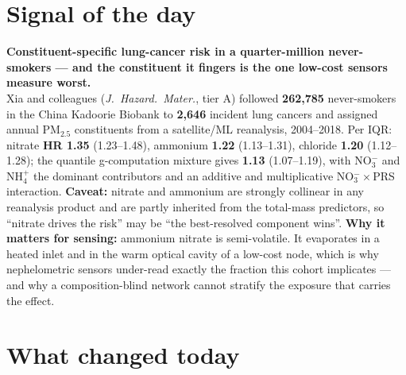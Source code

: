 \documentclass[10pt]{article}
\begin{document}
\vspace{6mm}

\section*{\sffamily\bfseries\color{Deep}Signal of the day}
\vspace{-1.5mm}{\color{Amber}\rule{\linewidth}{1.1pt}}\vspace{2.5mm}

\begin{keybox}
{\sffamily\bfseries\small\color{Deep}Constituent-specific lung-cancer risk in a quarter-million
never-smokers --- and the constituent it fingers is the one low-cost sensors measure worst.}\\[1.4mm]
\footnotesize
Xia and colleagues (\textit{J.\ Hazard.\ Mater.}, tier A) followed \textbf{262,785} never-smokers in the
China Kadoorie Biobank to \textbf{2,646} incident lung cancers and assigned annual PM$_{2.5}$ constituents
from a satellite/ML reanalysis, 2004--2018. Per IQR: nitrate \textbf{HR 1.35} (1.23--1.48), ammonium
\textbf{1.22} (1.13--1.31), chloride \textbf{1.20} (1.12--1.28); the quantile g-computation mixture gives
\textbf{1.13} (1.07--1.19), with NO$_3^-$ and NH$_4^+$ the dominant contributors and an additive and
multiplicative NO$_3^-\times$PRS interaction. \textbf{Caveat:} nitrate and ammonium are strongly collinear
in any reanalysis product and are partly inherited from the total-mass predictors, so ``nitrate drives the
risk'' may be ``the best-resolved component wins''.
\textbf{Why it matters for sensing:} ammonium nitrate is semi-volatile. It evaporates in a heated inlet and
in the warm optical cavity of a low-cost node, which is why nephelometric sensors under-read exactly the
fraction this cohort implicates --- and why a composition-blind network cannot stratify the exposure that
carries the effect.\par
\end{keybox}

\vspace{3mm}

\section*{\sffamily\bfseries\color{Deep}What changed today}
\vspace{-1.5mm}{\color{Amber}\rule{\linewidth}{1.1pt}}\vspace{2.5mm}
\end{document}
